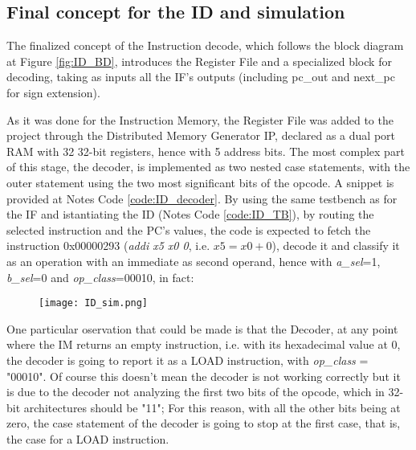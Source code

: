 \subsection{Final concept for the ID and simulation}
The finalized concept of the Instruction decode, which follows the block diagram at Figure \ref{fig:ID_BD}, introduces the Register File and a specialized block for decoding, taking as inputs all the IF's outputs (including {pc\_out} and {next\_pc} for sign extension).

As it was done for the Instruction Memory, the Register File was added to the project through the Distributed Memory Generator IP, declared as a dual port RAM with 32 32-bit registers, hence with 5 address bits. The most complex part of this stage, the decoder, is implemented as two nested case statements, with the outer statement using the two most significant bits of the opcode. A snippet is provided at Notes Code \ref{code:ID_decoder}.
By using the same testbench as for the IF and istantiating the ID (Notes Code \ref{code:ID_TB}), by routing the selected instruction and the PC's values, the code is expected to fetch the instruction 0x00000293 (\emph{addi x5 x0 0}, i.e. $x5 = x0 + 0$), decode it and classify it as an operation with an immediate as second operand, hence with \emph{a{\_}sel}=1, \emph{b{\_}sel}=0 and \emph{op{\_}class}=00010, in fact:

\begin{figure}[h!]
  \centering
  \texttt{[image: ID\_sim.png]}
\end{figure}

One particular oservation that could be made is that the Decoder, at any point where the IM returns an empty instruction, i.e. with its hexadecimal value at 0, the decoder is going to report it as a LOAD instruction, with \emph{op{\_}class} = "00010". Of course this doesn't mean the decoder is not working correctly but it is due to the decoder not analyzing the first two bits of the opcode, which in 32-bit architectures should be "11"; For this reason, with all the other bits being at zero, the case statement of the decoder is going to stop at the first case, that is, the case for a LOAD instruction.